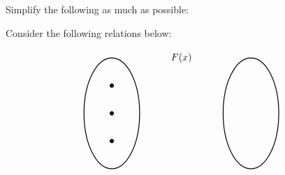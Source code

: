 \documentclass[12pt,letterpaper]{exam}
\begin{document}
\begin{questions}



\newpage



\question[6] Simplify the following as much as possible: \pspace
{}



\newpage



\question[6] Consider the following relations below:

	\[
	\begin{tikzpicture}
	\node at (2.5,2) {$F(x)$};
	\draw[line width=0.03cm] (0,0) circle (1 and 2);
	\draw[line width=0.03cm] (5,0) circle (1 and 2);
	
	\draw[fill=black] (0,1) circle (0.07);
	\draw[fill=black] (0,0) circle (0.07);
	\draw[fill=black] (0,-1) circle (0.07);
	

\end{tikzpicture}\]
\end{questions}
\end{document}
